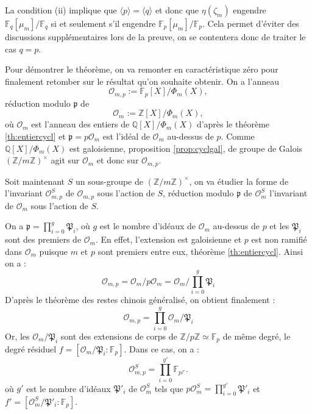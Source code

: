 \documentclass[a4paper]{article} %
\numberwithin{section}{part}
\numberwithin{equation}{section}
\newcommand\zmodninv[1]{(\mathbb{Z}/#1\mathbb{Z})^{\times}}
\newcommand\GF[1]{\mathbb{F}_{#1}}
\newcommand\QQ{\mathbb{Q}}
\newcommand\ZZ{\mathbb{Z}}
\newcommand\EO{\mathcal{O}}
\newcommand\groupgen[1]{\langle{#1}\rangle}
\begin{document}
La condition (ii) implique que $\groupgen{p} = \groupgen{q}$ et donc que
$\eta(\zeta_m)$ engendre $\GF{q}[\mu_m]/\GF{q}$ si et seulement s'il engendre
$\GF{p}[\mu_m]/\GF{p}$. Cela permet d'éviter des discussions supplémentaires 
lors de la preuve, on se contentera donc de traiter le cas $q = p$.\par
Pour démontrer le théorème, on va remonter en caractéristique zéro pour
finalement retomber sur le résultat qu'on souhaite obtenir. On a l'anneau 
\begin{equation}
\EO_{m,p} := \GF{p}[X]/\Phi_m(X),
\end{equation}
réduction modulo $\mathfrak{p}$ de 
\begin{equation}
\EO_m := \ZZ[X]/\Phi_m(X),
\end{equation}
où $\EO_m$ est l'anneau des entiers de $\QQ[X]/\Phi_m(X)$ d'après le théorème 
\ref{th:entiercycl} et $\mathfrak{p} = p\EO_m$ est l'idéal de $\EO_m$ au-dessus 
de $p$. Comme $\QQ[X]/\Phi_m(X)$ est galoisienne, proposition 
\ref{prop:cyclgal}, de groupe de Galois $\zmodninv{m}$ agit sur $\EO_m$ et donc 
sur $\EO_{m,p}$.\par
Soit maintenant $S$ un sous-groupe de $\zmodninv{m}$, on va étudier la forme de 
l'invariant $\EO_{m,p}^S$  de $\EO_{m,p}$ sous l'action de $S$, réduction modulo
$\mathfrak{p}$ de $\EO_m^S$ l'invariant de $\EO_m$ sous l'action de $S$.\par
On a $\mathfrak{p} = \prod_{i=0}^g{\mathfrak{P}_i}$, où $g$ est le nombre
d'idéaux de $\EO_m$ au-dessus de $p$ et les $\mathfrak{P}_i$ sont des premiers
de $\EO_m$. En effet, l'extension est galoisienne et $p$ est non ramifié dans 
$\EO_m$ puisque $m$ et $p$ sont premiers entre eux, théorème 
\ref{th:entiercycl}. Ainsi on a :
\begin{equation}
\EO_{m,p} = \EO_m/p\EO_m = \EO_m/\prod_{i=0}^g{\mathfrak{P}_i}
\end{equation}
D'après le théorème des restes chinois généralisé, on obtient finalement :
\begin{equation}
\EO_{m,p} = \prod_{i=0}^g{\EO_m/\mathfrak{P}_i}
\end{equation}
Or, les $\EO_m/\mathfrak{P}_i$ sont des extensions de corps de $\ZZ/p\ZZ\simeq
\GF{p}$ de même degré, le degré résiduel $f = [\EO_m/\mathfrak{P}_i:\GF{p}]$. 
Dans ce cas, on a :
\begin{equation}
\label{eq:structinvSmodp}
\EO_{m,p}^S = \prod_{i=0}^{g'}{\GF{p^{f'}}}.
\end{equation}
où $g'$ est le nombre d'idéaux $\mathfrak{P}'_i$ de $\EO_m^S$ tels que $p\EO_m^S
= \prod_{i = 0}^{g'}{\mathfrak{P}'_i}$ et $f' = 
[\EO_m^S/\mathfrak{P}'_i:\GF{p}]$.
\end{document}

